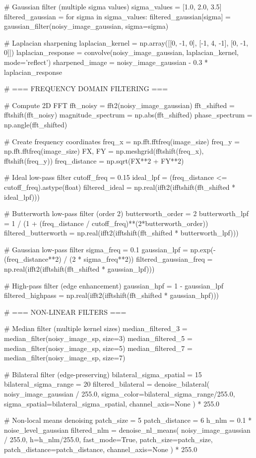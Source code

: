 \documentclass[a4paper, 11pt]{article}
\begin{document}
\begin{pycode}
# Gaussian filter (multiple sigma values)
sigma_values = [1.0, 2.0, 3.5]
filtered_gaussian = {}
for sigma in sigma_values:
    filtered_gaussian[sigma] = gaussian_filter(noisy_image_gaussian, sigma=sigma)

# Laplacian sharpening
laplacian_kernel = np.array([[0, -1, 0], [-1, 4, -1], [0, -1, 0]])
laplacian_response = convolve(noisy_image_gaussian, laplacian_kernel, mode='reflect')
sharpened_image = noisy_image_gaussian - 0.3 * laplacian_response

# === FREQUENCY DOMAIN FILTERING ===

# Compute 2D FFT
fft_noisy = fft2(noisy_image_gaussian)
fft_shifted = fftshift(fft_noisy)
magnitude_spectrum = np.abs(fft_shifted)
phase_spectrum = np.angle(fft_shifted)

# Create frequency coordinates
freq_x = np.fft.fftfreq(image_size)
freq_y = np.fft.fftfreq(image_size)
FX, FY = np.meshgrid(fftshift(freq_x), fftshift(freq_y))
freq_distance = np.sqrt(FX**2 + FY**2)

# Ideal low-pass filter
cutoff_freq = 0.15
ideal_lpf = (freq_distance <= cutoff_freq).astype(float)
filtered_ideal = np.real(ifft2(ifftshift(fft_shifted * ideal_lpf)))

# Butterworth low-pass filter (order 2)
butterworth_order = 2
butterworth_lpf = 1 / (1 + (freq_distance / cutoff_freq)**(2*butterworth_order))
filtered_butterworth = np.real(ifft2(ifftshift(fft_shifted * butterworth_lpf)))

# Gaussian low-pass filter
sigma_freq = 0.1
gaussian_lpf = np.exp(-(freq_distance**2) / (2 * sigma_freq**2))
filtered_gaussian_freq = np.real(ifft2(ifftshift(fft_shifted * gaussian_lpf)))

# High-pass filter (edge enhancement)
gaussian_hpf = 1 - gaussian_lpf
filtered_highpass = np.real(ifft2(ifftshift(fft_shifted * gaussian_hpf)))

# === NON-LINEAR FILTERS ===

# Median filter (multiple kernel sizes)
median_filtered_3 = median_filter(noisy_image_sp, size=3)
median_filtered_5 = median_filter(noisy_image_sp, size=5)
median_filtered_7 = median_filter(noisy_image_sp, size=7)

# Bilateral filter (edge-preserving)
bilateral_sigma_spatial = 15
bilateral_sigma_range = 20
filtered_bilateral = denoise_bilateral(
    noisy_image_gaussian / 255.0,
    sigma_color=bilateral_sigma_range/255.0,
    sigma_spatial=bilateral_sigma_spatial,
    channel_axis=None
) * 255.0

# Non-local means denoising
patch_size = 5
patch_distance = 6
h_nlm = 0.1 * noise_level_gaussian
filtered_nlm = denoise_nl_means(
    noisy_image_gaussian / 255.0,
    h=h_nlm/255.0,
    fast_mode=True,
    patch_size=patch_size,
    patch_distance=patch_distance,
    channel_axis=None
) * 255.0


\end{pycode}
\end{document}
